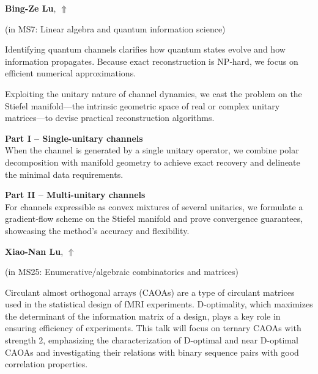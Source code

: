 \documentclass[ILAS2025-program.tex]{subfiles}
\begin{document}
\hypertarget{down0206}{}\begin{ilasabstract}
    
\textbf{Bing-Ze Lu},  \hfill \hyperlink{up0206}{$\Uparrow$}
    
    
(in {\color{mstitle}MS7: Linear algebra and quantum information science})
        
\mtskip
    Identifying quantum channels clarifies how quantum states evolve and how information propagates. Because exact reconstruction is NP‑hard, we focus on efficient numerical approximations.

Exploiting the unitary nature of channel dynamics, we cast the problem on the Stiefel manifold—the intrinsic geometric space of real or complex unitary matrices---to devise practical reconstruction algorithms.

\textbf{Part I -- Single-unitary channels} \\
\noindent When the channel is generated by a single unitary operator, we combine polar decomposition with manifold geometry to achieve exact recovery and delineate the minimal data requirements.

\textbf{Part II -- Multi-unitary channels} \\
\noindent For channels expressible as convex mixtures of several unitaries, we formulate a gradient‑flow scheme on the Stiefel manifold and prove convergence guarantees, showcasing the method’s accuracy and flexibility.

\end{ilasabstract}
    

\hypertarget{down0368}{}\begin{ilasabstract}
    
\textbf{Xiao-Nan Lu},  \hfill \hyperlink{up0368}{$\Uparrow$}
    
    
(in {\color{mstitle}MS25: Enumerative/algebraic combinatorics and matrices})
        
\mtskip
    Circulant almost orthogonal arrays (CAOAs) are a type of circulant matrices used in the statistical design of fMRI experiments. D-optimality, which maximizes the determinant of the information matrix of a design, plays a key role in ensuring efficiency of experiments.
This talk will focus on ternary CAOAs with strength $2$, emphasizing the characterization of D-optimal and near D-optimal CAOAs and investigating their relations with binary sequence pairs with good correlation properties.

\end{ilasabstract}
    
\end{document}
